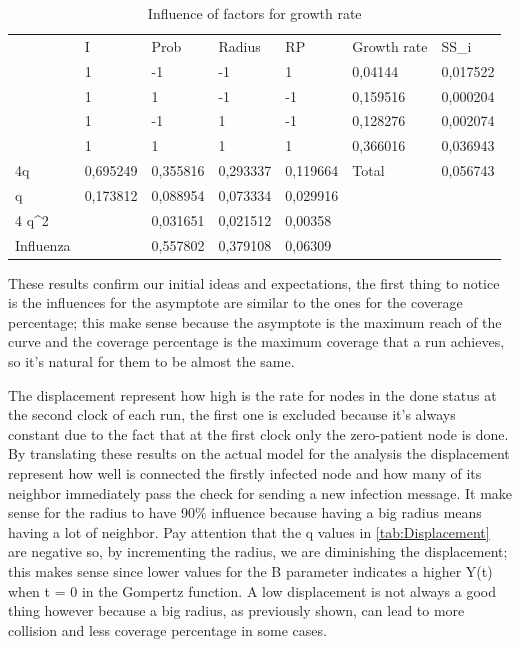 \begin{table}[H]
\centering
\begin{tabular}{l|l|l|l|l|ll}
\cline{2-7}
 & I & Prob & Radius & RP & \multicolumn{1}{l|}{Growth rate} & \multicolumn{1}{l|}{SS\_i} \\ \cline{2-7} 
 & 1 & -1 & -1 & 1 & \multicolumn{1}{l|}{0,04144} & \multicolumn{1}{l|}{0,017522} \\ \cline{2-7} 
 & 1 & 1 & -1 & -1 & \multicolumn{1}{l|}{0,159516} & \multicolumn{1}{l|}{0,000204} \\ \cline{2-7} 
 & 1 & -1 & 1 & -1 & \multicolumn{1}{l|}{0,128276} & \multicolumn{1}{l|}{0,002074} \\ \cline{2-7} 
 & 1 & 1 & 1 & 1 & \multicolumn{1}{l|}{0,366016} & \multicolumn{1}{l|}{0,036943} \\ \hline
\multicolumn{1}{|l|}{4q} & 0,695249 & 0,355816 & 0,293337 & 0,119664 & \multicolumn{1}{l|}{Total} & \multicolumn{1}{l|}{0,056743} \\ \hline
\multicolumn{1}{|l|}{q} & 0,173812 & 0,088954 & 0,073334 & 0,029916 &  &  \\ \cline{1-5}
\multicolumn{1}{|l|}{4 q\textasciicircum{}2} &  & 0,031651 & 0,021512 & 0,00358 &  &  \\ \cline{1-5}
\multicolumn{1}{|l|}{Influenza} &  & 0,557802 & 0,379108 & 0,06309 &  &  \\ \cline{1-5}
\end{tabular}
\caption{Influence of factors for growth rate}
\end{table}

These results confirm our initial ideas and expectations, the first thing to notice is the influences for the asymptote are similar to the ones for the coverage percentage; this make sense because the asymptote is the maximum reach of the curve and the coverage percentage is the maximum coverage that a run achieves, so it's natural for them to be almost the same. 

\medskip
The displacement represent how high is the rate for nodes in the done status at the second clock of each run, the first one is excluded because it's always constant due to the fact that at the first clock only the zero-patient node is done. By translating these results on the actual model for the analysis the displacement represent how well is connected the firstly infected node and how many of its neighbor immediately pass the check for sending a new infection message. It make sense for the radius to have 90\% influence because having a big radius means having a lot of neighbor. Pay attention that the q values in \ref{tab:Displacement} are negative so, by incrementing the radius, we are diminishing the displacement; this makes sense since lower values for the B parameter indicates a higher Y(t) when t = 0 in the Gompertz function. A low displacement is not always a good thing however because a big radius, as previously shown, can lead to more collision and less coverage percentage in some cases. 

